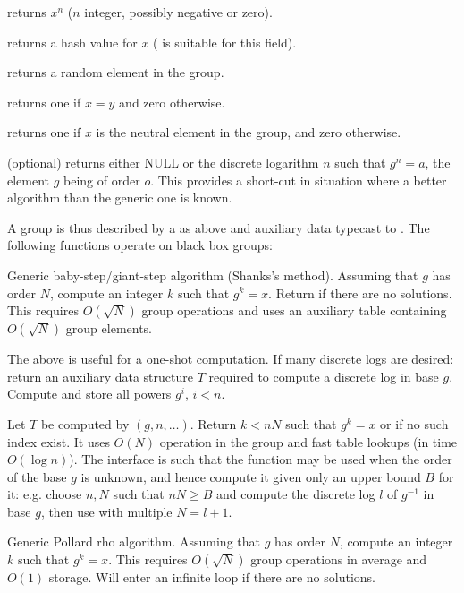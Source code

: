  returns $x^n$ ($n$ integer, possibly negative or zero).

 returns a hash value for $x$ ( is suitable for this field).

 returns a random element in the group.

 returns one if $x=y$ and zero otherwise.

 returns one if $x$ is the neutral element in the group,
and zero otherwise.

 (optional) returns either NULL or the discrete logarithm
$n$ such that $g^n=a$, the element $g$ being of order $o$. This provides a
short-cut in situation where a better algorithm than the generic one is known.

A group is thus described by a  as above and auxiliary
data typecast to . The following functions operate on black box
groups:

 \break
Generic baby-step/giant-step algorithm (Shanks's method). Assuming
that $g$ has order $N$, compute an integer $k$ such that $g^k = x$.
Return  if there are no solutions. This requires
$O(\sqrt{N})$ group operations and uses an auxiliary table containing
$O(\sqrt{N})$ group elements.

The above is useful for a one-shot computation. If many discrete logs
are desired:
return an auxiliary data structure $T$ required to compute a discrete log in
base $g$. Compute and store all powers $g^i$,  $i < n$.

Let $T$ be computed by $(g,n,\dots)$.
Return $k < n N$ such that  $g^k = x$ or  if no such index exist.
It uses $O(N)$ operation in the group and fast table lookups  (in time
$O(\log n)$). The interface is such that the function may be used when the
order of the base $g$ is unknown, and hence compute it given only an upper
bound $B$ for it: e.g. choose $n,N$ such that $nN \geq B$ and compute the
discrete log $l$ of $g^{-1}$ in base $g$, then use 
with multiple $N = l+1$.

 \break
Generic Pollard rho algorithm. Assuming that $g$ has order $N$, compute an
integer $k$ such that $g^k = x$. This requires $O(\sqrt{N})$ group operations
in average and $O(1)$ storage. Will enter an infinite loop if there are no
solutions.

